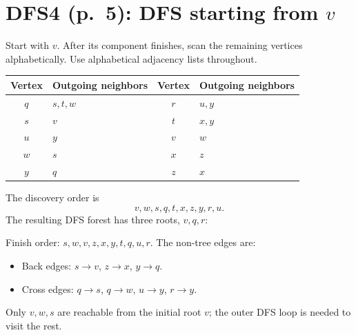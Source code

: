 \documentclass[11pt,a4paper]{article}
\newcommand{\question}[2]{\section*{#1: #2}}
\begin{document}
\newpage
\question{DFS4 (p.\ 5)}{DFS starting from $v$}
Start with $v$. After its component finishes, scan the remaining vertices alphabetically. Use alphabetical adjacency lists throughout.
\begin{center}\begin{tabular}{c|l@{\qquad}c|l}\toprule
Vertex&Outgoing neighbors&Vertex&Outgoing neighbors\\\midrule
$q$&$s,t,w$&$r$&$u,y$\\$s$&$v$&$t$&$x,y$\\$u$&$y$&$v$&$w$\\$w$&$s$&$x$&$z$\\$y$&$q$&$z$&$x$\\\bottomrule\end{tabular}\end{center}
The discovery order is
\[
\boxed{v,w,s,q,t,x,z,y,r,u}.
\]
The resulting DFS forest has three roots, $v,q,r$:
\begin{center}\end{center}
Finish order: $s,w,v,z,x,y,t,q,u,r$. The non-tree edges are:
\begin{itemize}[nosep]
\item Back edges: $s\to v$, $z\to x$, $y\to q$.
\item Cross edges: $q\to s$, $q\to w$, $u\to y$, $r\to y$.
\end{itemize}
Only $v,w,s$ are reachable from the initial root $v$; the outer DFS loop is needed to visit the rest.
\end{document}
